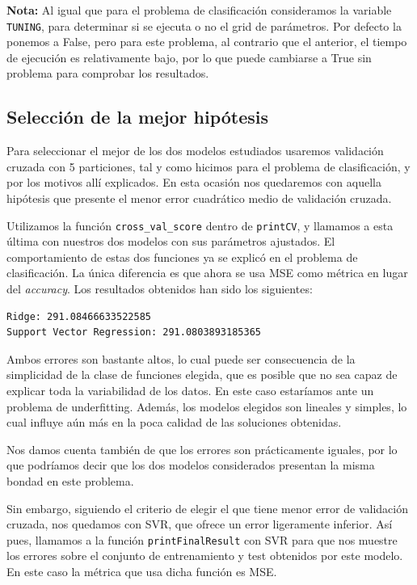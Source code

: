\documentclass[a4]{article}
\begin{document}
\textbf{Nota:} Al igual que para el problema de clasificación consideramos la variable \lstinline|TUNING|, para determinar si se ejecuta o no el grid de parámetros. Por defecto la ponemos a False, pero para este problema, al contrario que el anterior, el tiempo de ejecución es relativamente bajo, por lo que puede cambiarse a True sin problema para comprobar los resultados. 

\subsection{Selección de la mejor hipótesis}

Para seleccionar el mejor de los dos modelos estudiados usaremos validación cruzada con 5 particiones, tal y como hicimos para el problema de clasificación, y por los motivos allí explicados. En esta ocasión nos quedaremos con aquella hipótesis que presente el menor error cuadrático medio de validación cruzada. 

Utilizamos la función \lstinline|cross_val_score| dentro de \lstinline|printCV|, y llamamos a esta última con nuestros dos modelos con sus parámetros ajustados. El comportamiento de estas dos funciones ya se explicó en el problema de clasificación. La única diferencia es que ahora se usa MSE como métrica en lugar del \textit{accuracy}. Los resultados obtenidos han sido los siguientes: 

\begin{lstlisting}
Ridge: 291.08466633522585
Support Vector Regression: 291.0803893185365
\end{lstlisting}

Ambos errores son bastante altos, lo cual puede ser consecuencia de la simplicidad de la clase de funciones elegida, que es posible que no sea capaz de explicar toda la variabilidad de los datos. En este caso estaríamos ante un problema de underfitting. Además, los modelos elegidos son lineales y simples, lo cual influye aún más en la poca calidad de las soluciones obtenidas. 

Nos damos cuenta también de que los errores son prácticamente iguales, por lo que podríamos decir que los dos modelos considerados presentan la misma bondad en este problema. 

Sin embargo, siguiendo el criterio de elegir el que tiene menor error de validación cruzada, nos quedamos con SVR, que ofrece un error ligeramente inferior. Así pues, llamamos a la función \lstinline|printFinalResult| con SVR para que nos muestre los errores sobre el conjunto de entrenamiento y test obtenidos por este modelo. En este caso la métrica que usa dicha función es MSE. 
\end{document}
